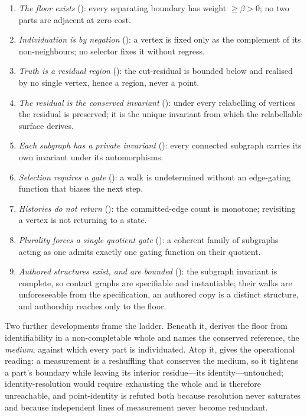 \documentclass[11pt,a4paper]{article}
\theoremstyle{thmstyle}
\theoremstyle{definition}
\theoremstyle{remark}
\newcommand{\floorc}{\beta}               %
\begin{document}
\begin{enumerate}[label=\textbf{(T\arabic*)},leftmargin=3em,start=0]
\item \emph{The floor exists} (): every separating boundary has
weight $\ge\floorc>0$; no two parts are adjacent at zero cost.
\item \emph{Individuation is by negation} (): a vertex is
fixed only as the complement of its non-neighbours; no selector fixes it without
regress.
\item \emph{Truth is a residual region} (): the cut-residual
is bounded below and realised by no single vertex, hence a region, never a
point.
\item \emph{The residual is the conserved invariant} ():
under every relabelling of vertices the residual is preserved; it is the unique
invariant from which the relabellable surface derives.
\item \emph{Each subgraph has a private invariant} (): every
connected subgraph carries its own invariant under its automorphisms.
\item \emph{Selection requires a gate} (): a walk is
undetermined without an edge-gating function that biases the next step.
\item \emph{Histories do not return} (): the committed-edge
count is monotone; revisiting a vertex is not returning to a state.
\item \emph{Plurality forces a single quotient gate} (): a
coherent family of subgraphs acting as one admits exactly one gating function on
their quotient.
\item \emph{Authored structures exist, and are bounded} ():
the subgraph invariant is complete, so contact graphs are specifiable and
instantiable; their walks are unforeseeable from the specification, an authored
copy is a distinct structure, and authorship reaches only to the floor.
\end{enumerate}

Two further developments frame the ladder. Beneath it,  derives
the floor from identifiability in a non-completable whole and names the conserved
reference, the \emph{medium}, against which every part is individuated. Atop it,
 gives the operational reading: a measurement is a
reshuffling that conserves the medium, so it tightens a part's boundary while
leaving its interior residue---its identity---untouched; identity-resolution would
require exhausting the whole and is therefore unreachable, and point-identity is
refuted both because resolution never saturates and because independent lines of
measurement never become redundant.
\end{document}
